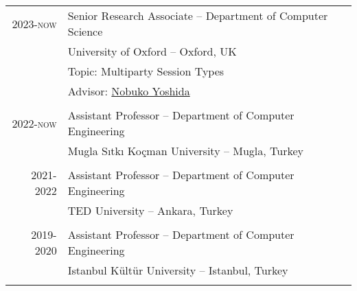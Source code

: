 \documentclass[a4paper,9pt]{article} %
\begin{document}
\begin{tabular}{r|p{13cm}}
\textsc{2023-now} & Senior Research Associate -- {Department of Computer Science}\\
& { University of Oxford -- Oxford, UK} \\
& Topic: Multiparty Session Types\\
& Advisor: \href{https://www.cs.ox.ac.uk/people/nobuko.yoshida/}{Nobuko Yoshida}\\
\multicolumn{2}{c}{} \\


\textsc{2022-now} & Assistant Professor -- {Department of Computer Engineering}\\
&{Mugla Sıtkı Koçman University -- Mugla, Turkey}\\
\multicolumn{2}{c}{} \\



\textsc{2021-2022} & Assistant Professor -- {Department of Computer Engineering}\\
& {TED University -- Ankara, Turkey}\\
\multicolumn{2}{c}{} \\



\textsc{2019-2020} & Assistant Professor -- {Department of Computer Engineering}\\
& {Istanbul Kültür University -- Istanbul, Turkey}\\
\multicolumn{2}{c}{} \\


\end{tabular}
\end{document}
